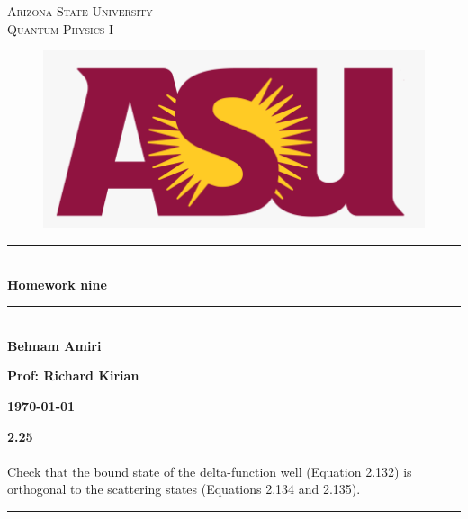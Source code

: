 \documentclass[fleqn]{article}
\begin{document}
  \begin{titlepage}

    \newcommand{\HRule}{\rule{\linewidth}{0.5mm}}

    \center


    \textsc{\LARGE Arizona State University}\\[1.5cm]

    \textsc{\LARGE Quantum Physics I }\\[1.5cm]


    \begin{figure}
      \includegraphics[width=\linewidth]{asu.png}
    \end{figure}


    \HRule \\[0.4cm]
    { \huge \bfseries Homework nine}\\[0.4cm] 
    \HRule \\[1.5cm]

    \textbf{Behnam Amiri}

    \bigbreak

    \textbf{Prof: Richard Kirian}

    \bigbreak


    \textbf{{\large \today}\\[2cm]}

    \vfill 

  \end{titlepage}

  \textbf{2.25} \\ \\
  Check that the bound state of the delta-function well (Equation 2.132) is orthogonal to the 
  scattering states (Equations 2.134 and 2.135).

  \rule{15cm}{1pt}
\end{document}
